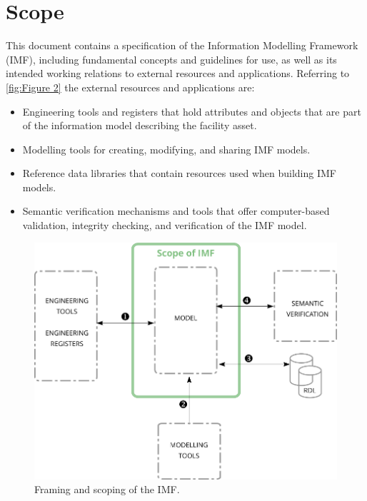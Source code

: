 \documentclass[../main.tex]{subfiles}
\begin{document}

\chapter{Scope}
\label{ch:Chapter 1}

This document contains a specification of the Information Modelling Framework (IMF), including 
 fundamental concepts and guidelines for use, as well as
its intended working relations to external resources and applications. Referring to \autoref{fig:Figure 2} the external resources and applications are: 
 \begin{itemize}
     \item[\ding{182}]  Engineering tools and registers that hold attributes and objects that are part of the information model describing the facility asset. 
     \item[\ding{183}]  Modelling tools for creating, modifying, and sharing IMF models.
\item[\ding{184}]  Reference data libraries that contain resources used when building IMF models. 
\item[\ding{185}]  Semantic verification mechanisms and tools that offer computer-based validation, integrity checking, and verification of the
IMF model.
\end{itemize}

\begin{figure}[h]
  \centering
  \includegraphics[width=.7\textwidth]{img/IMFmanual-img002.png}
  \caption{Framing and scoping of the IMF.}
  \label{fig:Figure 2}
\end{figure}
\end{document}
